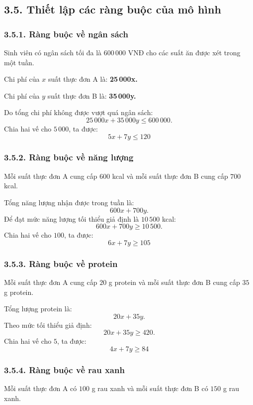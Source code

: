 \documentclass[12pt,a4paper]{article}
\begin{document}
\subsection*{3.5. Thiết lập các ràng buộc của mô hình}

\subsubsection*{3.5.1. Ràng buộc về ngân sách}

Sinh viên có ngân sách tối đa là $600\,000$ VNĐ cho các suất ăn được xét trong một tuần.

Chi phí của $x$ suất thực đơn A là: \textbf{25\,000x.}

Chi phí của $y$ suất thực đơn B là: \textbf{35\,000y.}

Do tổng chi phí không được vượt quá ngân sách:
\[
25\,000x+35\,000y\leq600\,000.
\]
Chia hai vế cho $5\,000$, ta được:
\[
\boxed{
5x+7y\leq120
}
\tag{1}
\]

\subsubsection*{3.5.2. Ràng buộc về năng lượng}

Mỗi suất thực đơn A cung cấp $600$ kcal và mỗi suất thực đơn B cung
cấp $700$ kcal.

Tổng năng lượng nhận được trong tuần là:
\[
600x+700y.
\]
Để đạt mức năng lượng tối thiểu giả định là $10\,500$ kcal:
\[
600x+700y\geq10\,500.
\]
Chia hai vế cho $100$, ta được:
\[
\boxed{
6x+7y\geq105
}
\tag{2}
\]

\subsubsection*{3.5.3. Ràng buộc về protein}

Mỗi suất thực đơn A cung cấp $20$ g protein và mỗi suất thực đơn B cung cấp $35$ g protein.

Tổng lượng protein là:
\[
20x+35y.
\]
Theo mức tối thiểu giả định:
\[
20x+35y\geq420.
\]
Chia hai vế cho $5$, ta được:
\[
\boxed{
4x+7y\geq84
}
\tag{3}
\]

\subsubsection*{3.5.4. Ràng buộc về rau xanh}

Mỗi suất thực đơn A có $100$ g rau xanh và mỗi suất thực đơn B có $150$ g rau xanh.
\end{document}
